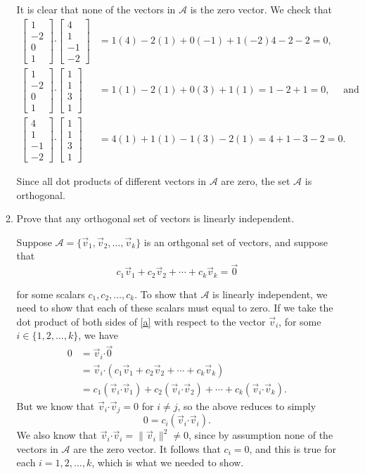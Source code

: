 \documentclass[letterpaper,12pt]{article}
\newcommand{\len}[1]{\lVert #1\rVert}
\newcommand{\dotp}{\boldsymbol{\cdot}}
\newcommand{\bbm}{\begin{bmatrix}}
\newcommand{\ebm}{\end{bmatrix}}
\begin{document}
\begin{enumerate}
\begin{enumerate}
\bigskip

It is clear that none of the vectors in $\mathcal{A}$ is the zero vector. We check that
\begin{align*}
 \bbm 1\\-2\\0\\1\ebm \dotp \bbm 4\\1\\-1\\-2\ebm &= 1(4)-2(1)+0(-1)+1(-2) 4-2-2=0,\\
 \bbm 1\\-2\\0\\1\ebm \dotp \bbm 1\\1\\3\\1\ebm & = 1(1)-2(1)+0(3)+1(1) = 1-2+1=0, \quad \text{ and}\\
 \bbm 4\\1\\-1\\-2\ebm \dotp \bbm 1\\1\\3\\1\ebm & = 4(1)+1(1)-1(3)-2(1) = 4+1-3-2=0.
\end{align*}

Since all dot products of different vectors in $\mathcal{A}$ are zero, the set $\mathcal{A}$ is orthogonal.


 \item Prove that any orthogonal set of vectors is linearly independent.

\bigskip

Suppose $\mathcal{A} = \{\vec{v}_1,\vec{v}_2,\ldots, \vec{v}_k\}$ is an orthgonal set of vectors, and suppose that
\begin{equation}\label{a}
 c_1\vec{v}_1+c_2\vec{v}_2+\cdots +c_k\vec{v}_k=\vec{0}
\end{equation}

for some scalars $c_1,c_2,\ldots, c_k$. To show that $\mathcal{A}$ is linearly independent, we need to show that each of these scalars must equal to zero. If we take the dot product of both sides of \eqref{a} with respect to the vector $\vec{v}_i$, for some $i\in\{1,2,\ldots, k\}$, we have
\begin{align*}
 0 & = \vec{v}_i\dotp \vec{0}\\
 & = \vec{v}_i\dotp (c_1\vec{v}_1+c_2\vec{v}_2+\cdots +c_k\vec{v}_k)\\
 & = c_1(\vec{v}_i\dotp \vec{v}_1) +c_2(\vec{v}_i\dotp \vec{v}_2)+ \cdots + c_k(\vec{v}_i\dotp \vec{v}_k).
\end{align*}
But we know that $\vec{v}_i\dotp \vec{v}_j = 0$ for $i\neq j$, so the above reduces to simply
\[
 0=c_i(\vec{v}_i\dotp \vec{v}_i).
\]
We also know that $\vec{v}_i\dotp\vec{v}_i = \len{\vec{v}_i}^2\neq 0$, since by assumption none of the vectors in $\mathcal{A}$ are the zero vector. It follows that $c_i=0$, and this is true for each $i=1,2,\ldots, k$, which is what we needed to show.


\end{enumerate}
\end{enumerate}
\end{document}
